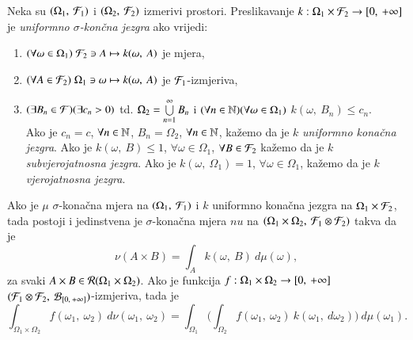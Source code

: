 \begin{defn}    \label{defn:4.17}
    Neka su $({\Omega_1}, \: {\mathcal{F}_1})$ i $({\Omega_2}, \: {\mathcal{F}_2})$ izmerivi prostori. Preslikavanje $k : \Omega_1 \times \mathcal{F}_2 \to [{0}, \:{+\infty}]$ je \emph{uniformno $\sigma$-kon\v cna jezgra} ako vrijedi:
    \begin{enumerate}[label=(\alph*)]
        \item $(\forall \omega \in \Omega_1 ) \; \mathcal{F}_2 \ni A \mapsto k(\omega, \: A)$ je mjera,
        \item $(\forall A \in \mathcal{F}_2 ) \; \Omega_1 \ni \omega \mapsto k(\omega, \: A)$ je $\mathcal{F}_1$-izmjeriva,
        \item $(\exists B_n \in \mathcal{F})(\exists c_n > 0) $ td. $ \Omega_2 = \bigcup\limits_{n = 1}^{\infty} B_n$ i $(\forall n \in \mathbb{N})(\forall \omega \in \Omega_1)$ $k(\omega, \: B_n) \leq c_n$.\\
        Ako je $c_n = c$, $\forall n \in \mathbb{N}$, $B_n = \Omega_2$, $\forall n \in \mathbb{N}$, ka\v zemo da je $k$ \emph{uniformno kona\v cna jezgra}. Ako je $k(\omega, \: B) \leq 1$, $\forall \omega \in \Omega_1$, $\forall B \in \mathcal{F}_2$ ka\v zemo da je $k$ \emph{subvjerojatnosna jezgra}. Ako je $k(\omega, \: \Omega_1) = 1$, $\forall \omega \in \Omega_1$, ka\v zemo da je $k$ \emph{vjerojatnosna jezgra}.
    \end{enumerate}
\end{defn}

\begin{zad} \label{zad:4.18}
    Ako je $\mu$ $\sigma$-kona\v cna mjera na $({\Omega_1}, \: {\mathcal{F}_1})$ i $k$ uniformno kona\v cna jezgra na $\Omega_1 \times \mathcal{F}_2$, tada postoji i jedinstvena je $\sigma$-kona\v cna mjera $nu$ na $({\Omega_1 \times \Omega_2}, \: {\mathcal{F}_1 \otimes \mathcal{F}_2})$ takva da je
    \begin{equation*}
        \nu (A \times B) = \int_A k(\omega, \: B) \: d \mu (\omega),
    \end{equation*}
    za svaki $A \times B \in \mathcal{R}({\Omega_1 \times \Omega_2})$.
    Ako je funkcija $f:\Omega_1 \times \Omega_2 \to [{0}, \:{+\infty}]$ $({\mathcal{F}_1 \otimes \mathcal{F}_2}, \: {\mathcal{B}_{[{0}, \:{+\infty}]}})$-izmjeriva, tada je
    \begin{equation*}
        \int_{\Omega_1 \times \Omega_2} f(\omega_1, \: \omega_2) \: d \nu (\omega_1, \: \omega_2) = \int_{\Omega_1} \Big( \int_{\Omega_2} f(\omega_1, \: \omega_2) \: k(\omega_1, \: d \omega_2) \Big) \: d \mu (\omega_1).
    \end{equation*}
\end{zad}


